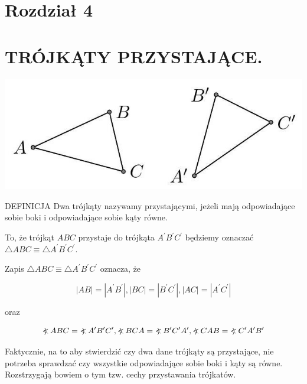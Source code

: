 \documentclass[10pt]{article}
\newcommand\Varangle{\mathop{{<\!\!\!\!\!\text{\small)}}\:}\nolimits}
\begin{document}
\section*{Rozdział 4}
\section*{TRÓJKĄTY PRZYSTAJĄCE.}
\begin{center}
\includegraphics[max width=\textwidth]{2024_11_21_71f62bd117d375398909g-045(1)}
\end{center}

DEFINICJA Dwa trójkąty nazywamy przystającymi, jeżeli mają odpowiadające sobie boki i odpowiadające sobie kąty równe.

To, że trójkąt \(A B C\) przystaje do trójkąta \(A^{\prime} B^{\prime} C^{\prime}\) będziemy oznaczać \(\triangle A B C \equiv \triangle A^{\prime} B^{\prime} C^{\prime}\).

Zapis \(\triangle A B C \equiv \triangle A^{\prime} B^{\prime} C^{\prime}\) oznacza, że

\[
|A B|=\left|A^{\prime} B^{\prime}\right|,|B C|=\left|B^{\prime} C^{\prime}\right|,|A C|=\left|A^{\prime} C^{\prime}\right|
\]

oraz

\[
\Varangle A B C=\Varangle A^{\prime} B^{\prime} C^{\prime}, \Varangle B C A=\Varangle B^{\prime} C^{\prime} A^{\prime}, \Varangle C A B=\Varangle C^{\prime} A^{\prime} B^{\prime}
\]

Faktycznie, na to aby stwierdzić czy dwa dane trójkąty są przystające, nie potrzeba sprawdzać czy wszystkie odpowiadające sobie boki i kąty są równe. Rozstrzygają bowiem o tym tzw. cechy przystawania trójkatów.
\end{document}
